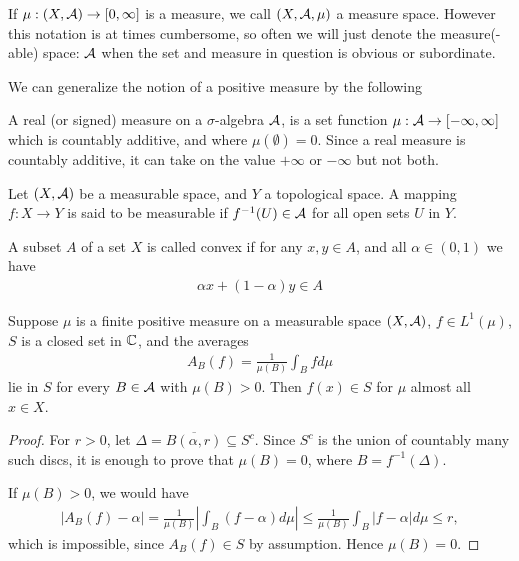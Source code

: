 If $\mu:(X,\mathcal{A})\to [0, \infty]$ is a measure, we call $(X, \mathcal{A}, \mu)$ a measure space. However this notation is at times cumbersome, so often we will just denote the measure(-able) space: $\mathcal{A}$ when the set and measure in question is obvious or subordinate.

We can generalize the notion of a positive measure by the following

\begin{definition}
A real (or signed) measure on a $\sigma$-algebra $\mathcal{A}$, is a set function $\mu: \mathcal{A} \to [-\infty, \infty]$ which is countably additive, and where $\mu(\emptyset)=0$. Since a real measure is countably additive, it can take on the value $+\infty$ or $-\infty$ but not both.
\end{definition}


\begin{definition}
Let $(X, \mathcal{A})$ be a measurable space, and $Y$ a topological space. A mapping $f: X \to Y$ is said to be measurable if $f^{-1}(U)\in \mathcal{A}$ for all open sets $U$ in $Y$.
\end{definition}

\begin{definition}
A subset $A$ of a set $X$ is called convex if for any $x,y \in A$, and all $\alpha \in (0,1)$ we have
\begin{align*}
	\alpha x + (1-\alpha)y \in A
\end{align*}
\end{definition}

\begin{theorem}\label{thm: average lies in S}
Suppose $\mu$ is a finite positive measure on a measurable space $(X, \mathcal{A})$, $f\in L^{1}(\mu)$, $S$ is a closed set in $\mathbb{C}$, and the averages
\begin{align*}
	A_{B}(f)=\frac{1}{\mu(B)}\int_{B}fd\mu
\end{align*}
lie in $S$ for every $B\in \mathcal{A}$ with $\mu(B)>0$. Then $f(x)\in S$ for $\mu$ almost all $x \in X$.
\end{theorem}
\begin{proof}
For $r>0$, let $\Delta=\overline{B(\alpha, r)}\subseteq S^{c}$. Since $S^{c}$ is the union of countably many such discs, it is enough to prove that $\mu(B)=0$, where $B=f^{-1}(\Delta)$.

If $\mu(B)>0$, we would have
\begin{align*}
	|A_{B}(f)-\alpha| = \frac{1}{\mu(B)} \left| \int_{B}(f-\alpha)d\mu \right| \le \frac{1}{\mu(B)} \int_{B}|f-\alpha|d\mu \le r,
\end{align*}
which is impossible, since $A_{B}(f)\in S$ by assumption. Hence $\mu(B)=0$.
\end{proof}

